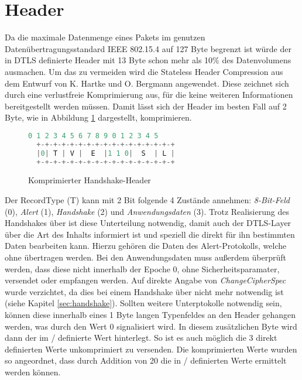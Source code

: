 \section{Header}

Da die maximale Datenmenge eines Pakets im genutzen Datenübertragungsstandard IEEE 802.15.4 \cite{ieee802154} auf 127 Byte begrenzt ist würde der in DTLS
definierte Header mit 13 Byte schon mehr als 10\% des Datenvolumens ausmachen. Um das zu vermeiden wird die Stateless Header Compression aus dem Entwurf
von K. Hartke und O. Bergmann \cite[Kapitel 3]{draftcodtls} angewendet. Diese zeichnet sich durch eine verlustfreie Komprimierung aus, für die keine weiteren
Informationen bereitgestellt werden müssen. Damit lässt sich der Header im besten Fall auf 2 Byte, wie in Abbildung \ref{fig:com_handshake_header} dargestellt,
komprimieren.

\begin{figure}[ht]
  \centering
  \begin{lstlisting}[language=c]
   0 1 2 3 4 5 6 7 8 9 0 1 2 3 4 5
  +-+-+-+-+-+-+-+-+-+-+-+-+-+-+-+-+
  |0| T | V |  E  |1 1 0|  S  | L |
  +-+-+-+-+-+-+-+-+-+-+-+-+-+-+-+-+
  \end{lstlisting}
  \caption{Komprimierter Handshake-Header}
  \label{fig:com_handshake_header}
\end{figure}

Der RecordType (T) kann mit 2 Bit folgende 4 Zustände annehmen: \textit{8-Bit-Feld} (0), \textit{Alert} (1), \textit{Handshake} (2) und
\textit{Anwendungsdaten} (3). Trotz Realisierung des Handshakes über  ist diese Unterteilung notwendig, damit auch der DTLS-Layer über die
Art des Inhalts informiert ist und speziell die direkt für ihn bestimmten Daten bearbeiten kann. Hierzu gehören die Daten des Alert-Protokolls,
welche ohne  übertragen werden. Bei den Anwendungsdaten muss außerdem überprüft werden, dass diese nicht innerhalb der Epoche 0, ohne
Sicherheitsparamater, versendet oder empfangen werden. Auf direkte Angabe von \textit{ChangeCipherSpec} wurde verzichtet, da dies bei einem
Handshake über  nicht mehr notwendig ist (siehe Kapitel \ref{sec:handshake}). Sollten  weitere Unterptokolle notwendig sein, können
diese innerhalb eines 1 Byte langen Typenfeldes an den Header gehangen werden, was durch den Wert 0 signalisiert wird. In diesem zusätzlichen
Byte wird dann der im / definierte Wert hinterlegt. So ist es auch möglich die 3 direkt definierten Werte unkomprimiert zu
versenden. Die komprimierten Werte wurden so angeordnet, dass durch Addition von 20 die in / definierten Werte ermittelt werden können.

